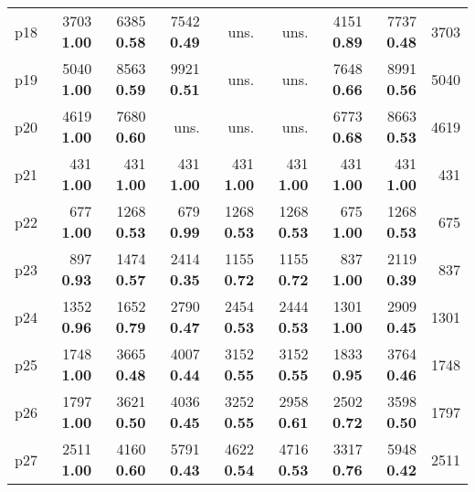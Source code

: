 \begin{tabular}{|l|rrrrrrr|r|}
p18 & {\footnotesize 3703} \textbf{1.00} & {\footnotesize 6385} \textbf{0.58} & {\footnotesize 7542} \textbf{0.49} & uns. & uns. & {\footnotesize 4151} \textbf{0.89} & {\footnotesize 7737} \textbf{0.48} & 3703\\
p19 & {\footnotesize 5040} \textbf{1.00} & {\footnotesize 8563} \textbf{0.59} & {\footnotesize 9921} \textbf{0.51} & uns. & uns. & {\footnotesize 7648} \textbf{0.66} & {\footnotesize 8991} \textbf{0.56} & 5040\\
p20 & {\footnotesize 4619} \textbf{1.00} & {\footnotesize 7680} \textbf{0.60} & uns. & uns. & uns. & {\footnotesize 6773} \textbf{0.68} & {\footnotesize 8663} \textbf{0.53} & 4619\\
p21 & {\footnotesize 431} \textbf{1.00} & {\footnotesize 431} \textbf{1.00} & {\footnotesize 431} \textbf{1.00} & {\footnotesize 431} \textbf{1.00} & {\footnotesize 431} \textbf{1.00} & {\footnotesize 431} \textbf{1.00} & {\footnotesize 431} \textbf{1.00} & 431\\
p22 & {\footnotesize 677} \textbf{1.00} & {\footnotesize 1268} \textbf{0.53} & {\footnotesize 679} \textbf{0.99} & {\footnotesize 1268} \textbf{0.53} & {\footnotesize 1268} \textbf{0.53} & {\footnotesize 675} \textbf{1.00} & {\footnotesize 1268} \textbf{0.53} & 675\\
p23 & {\footnotesize 897} \textbf{0.93} & {\footnotesize 1474} \textbf{0.57} & {\footnotesize 2414} \textbf{0.35} & {\footnotesize 1155} \textbf{0.72} & {\footnotesize 1155} \textbf{0.72} & {\footnotesize 837} \textbf{1.00} & {\footnotesize 2119} \textbf{0.39} & 837\\
p24 & {\footnotesize 1352} \textbf{0.96} & {\footnotesize 1652} \textbf{0.79} & {\footnotesize 2790} \textbf{0.47} & {\footnotesize 2454} \textbf{0.53} & {\footnotesize 2444} \textbf{0.53} & {\footnotesize 1301} \textbf{1.00} & {\footnotesize 2909} \textbf{0.45} & 1301\\
p25 & {\footnotesize 1748} \textbf{1.00} & {\footnotesize 3665} \textbf{0.48} & {\footnotesize 4007} \textbf{0.44} & {\footnotesize 3152} \textbf{0.55} & {\footnotesize 3152} \textbf{0.55} & {\footnotesize 1833} \textbf{0.95} & {\footnotesize 3764} \textbf{0.46} & 1748\\
p26 & {\footnotesize 1797} \textbf{1.00} & {\footnotesize 3621} \textbf{0.50} & {\footnotesize 4036} \textbf{0.45} & {\footnotesize 3252} \textbf{0.55} & {\footnotesize 2958} \textbf{0.61} & {\footnotesize 2502} \textbf{0.72} & {\footnotesize 3598} \textbf{0.50} & 1797\\
p27 & {\footnotesize 2511} \textbf{1.00} & {\footnotesize 4160} \textbf{0.60} & {\footnotesize 5791} \textbf{0.43} & {\footnotesize 4622} \textbf{0.54} & {\footnotesize 4716} \textbf{0.53} & {\footnotesize 3317} \textbf{0.76} & {\footnotesize 5948} \textbf{0.42} & 2511\\

\end{tabular}
